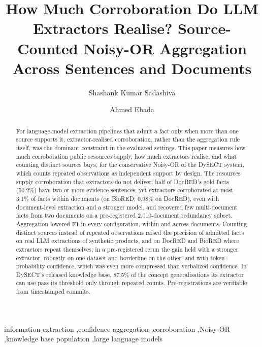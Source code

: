 \documentclass[preprint,12pt,authoryear]{elsarticle}
\begin{document}
\begin{frontmatter}

\title{How Much Corroboration Do LLM Extractors Realise? Source-Counted Noisy-OR Aggregation Across Sentences and Documents}

\author[inst1]{Shashank Kumar Sadashiva}
\author[inst1]{Ahmed Ebada}

\begin{abstract}
For language-model extraction pipelines that admit a fact only when more than one source supports it, extractor-realised corroboration, rather than the aggregation rule itself, was the dominant constraint in the evaluated settings. This paper measures how much corroboration public resources supply, how much extractors realise, and what counting distinct sources buys, for the conservative Noisy-OR of the DySECT system, which counts repeated observations as independent support by design. The resources supply corroboration that extractors do not deliver: half of DocRED's gold facts (50.2\%) have two or more evidence sentences, yet extractors corroborated at most 3.1\% of facts within documents (on BioRED; 0.98\% on DocRED), even with document-level extraction and a stronger model, and recovered few multi-document facts from two documents on a pre-registered 2,010-document redundancy subset. Aggregation lowered F1 in every configuration, within and across documents. Counting distinct sources instead of repeated observations raised the precision of admitted facts on real LLM extractions of synthetic products, and on DocRED and BioRED where extractors repeat themselves; in a pre-registered rerun the gain held with a stronger extractor, robustly on one dataset and borderline on the other, and with token-probability confidence, which was even more compressed than verbalized confidence. In DySECT's released knowledge base, 87.5\% of the concept generalisations its extractor can use pass its threshold only through repeated counts. Pre-registrations are verifiable from timestamped commits.
\end{abstract}

\begin{keyword}
information extraction \sep confidence aggregation \sep corroboration \sep Noisy-OR \sep knowledge base population \sep large language models
\end{keyword}

\end{frontmatter}
\end{document}

